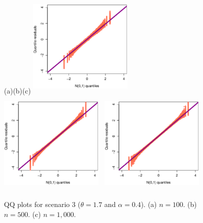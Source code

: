 \documentclass[12pt]{article}
\begin{document}
		
		\begin{figure}[!htb]\small
			\begin{center}
				(a)\hspace{4.5cm}(b)\hspace{4.5cm}(c)
				\includegraphics[width=5cm,height=5cm]{n_100_theta_1_7_alpha_0_4.eps}~
				\includegraphics[width=5cm,height=5cm]{n_500_theta_1_7_alpha_0_4.eps}~
				\includegraphics[width=5cm,height=5cm]{n_1000_theta_1_7_alpha_0_4.eps}
				\caption{QQ plots for scenario 3 ($\theta=1.7$ and $\alpha=0.4$). (a) $n=100$. (b) $n=500$. (c) $n = 1,000$.}\label{graf_simulacao_regressao_theta_1_7_alpha_0_4}
			\end{center}
		\end{figure}		
\end{document}
